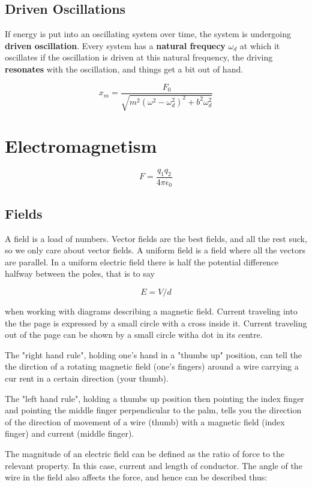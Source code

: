 \documentclass{article}
\begin{document}
\subsection{Driven Oscillations}
If energy is put into an oscillating system over time, the system is undergoing \textbf{driven oscillation}. Every system has a \textbf{natural frequecy} $\omega_d$ at which it oscillates if the oscillation is driven at this natural frequency, the driving \textbf{resonates} with the oscillation, and things get a bit out of hand.

\[x_m=\frac{F_0}{\sqrt{m^2\left(\omega^2-\omega_d^2\right)^2+b^2\omega_d^2}}\]

\section{Electromagnetism}

\[F=\frac{q_1q_2}{4\pi\epsilon_0}\]

\subsection{Fields}

A field is a load of numbers. Vector fields are the best fields, and all the rest suck, so we only care about vector fields. A uniform field is a field where all the vectors are parallel. In a uniform electric field there is half the potential difference halfway between the poles, that is to say

\[E=V/d\]

\noindent when working with diagrams describing a magnetic field. Current traveling into the the page is expressed by a small circle with a cross inside it. Current traveling out of the page can be shown by a small circle witha dot in its centre.

The "right hand rule", holding one's hand in a "thumbs up" position, can tell the the dirction of a rotating magnetic field (one's fingers) around a wire carrying a cur
rent in a certain direction (your thumb).

The "left hand rule", holding a thumbs up position then pointing the index finger and pointing the middle finger perpendicular to the palm, tells you the direction of the direction of movement of a wire (thumb) with a magnetic field (index finger) and current (middle finger).

The magnitude of an electric field can be defined as the ratio of force to the relevant property. In this case, current and length of conductor. The angle of the wire in the field also affects the force, and hence can be described thus:
\end{document}
